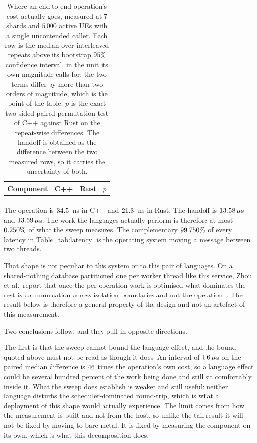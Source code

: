 \documentclass[english,oneside,a4paper,censored,csm,software-track-2020]{HYthesisML}
\begin{document}
\begin{table}[tp]
\centering
\small
\caption[Where an end-to-end operation's cost actually goes]{Where an end-to-end operation's cost actually goes, measured at $7$ shards and
$5\,000$ active UEs with a single uncontended caller. Each row is the median over
\BudgetRepeats{} interleaved repeats above its bootstrap $95\%$ confidence interval, in the
unit its own magnitude calls for: the two terms differ by more than two orders of magnitude,
which is the point of the table. $p$ is the exact two-sided paired permutation test of C++
against Rust on the repeat-wise differences. The handoff is obtained as the difference between
the two measured rows, so it carries the uncertainty of both.\label{tab:budget}}
\begin{tabular}{@{}l r r r@{}}
\hline\hline
Component & C++ & Rust & $p$ \\
\hline
\\
\hline
\end{tabular}
\end{table}

The operation is $34.5$~ns in C++ and $21.3$~ns in Rust. The handoff is
$13.58\,\mu$s and $13.59\,\mu$s. The work the languages actually
perform is therefore at most $0.250\%$ of what the sweep measures. The
complementary $99.750\%$ of every latency in Table~\ref{tab:latency} is the
operating system moving a message between two threads.

That shape is not peculiar to this system or to this pair of languages. On a shared-nothing
database partitioned one per worker thread like this service, Zhou et al.\ report that once the
per-operation work is optimised what dominates the rest is communication across isolation
boundaries and not the operation~\cite{zhou2025oltp}. The result below is therefore a general
property of the design and not an artefact of this measurement.

Two conclusions follow, and they pull in opposite directions.

The first is that the sweep cannot bound the language effect, and the bound quoted above must
not be read as though it does. An interval of $1.6\,\mu$s on the paired median
difference is $46$ times the operation's own cost, so a language effect could be
several hundred percent of the work being done and still sit comfortably inside it. What the sweep
does establish is weaker and still useful: neither language disturbs the
scheduler-dominated round-trip, which is what a deployment of this shape would actually
experience. The limit comes from how the measurement is built and not from the host, so unlike
the tail result it will not be fixed by moving to bare metal. It is fixed by measuring the
component on its own, which is what this decomposition does.
\end{document}
